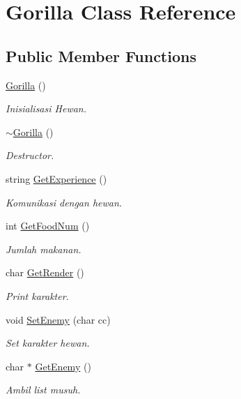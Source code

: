 \hypertarget{class_gorilla}{}\section{Gorilla Class Reference}
\label{class_gorilla}
\subsection*{Public Member Functions}
\begin{DoxyCompactItemize}
\item 
\hyperlink{class_gorilla_a01f4f53de267d241d46256ce1bb3cc3a}{Gorilla} ()\hypertarget{class_gorilla_a01f4f53de267d241d46256ce1bb3cc3a}{}\label{class_gorilla_a01f4f53de267d241d46256ce1bb3cc3a}

\begin{DoxyCompactList}\small\item\em Inisialisasi Hewan. \end{DoxyCompactList}\item 
\hyperlink{class_gorilla_a02383f1c2ef4a8ea19b8b17361e4117a}{$\sim$\+Gorilla} ()\hypertarget{class_gorilla_a02383f1c2ef4a8ea19b8b17361e4117a}{}\label{class_gorilla_a02383f1c2ef4a8ea19b8b17361e4117a}

\begin{DoxyCompactList}\small\item\em Destructor. \end{DoxyCompactList}\item 
string \hyperlink{class_gorilla_a3a5ec1d07dbfa5c49a4bd727d61cd16c}{Get\+Experience} ()\hypertarget{class_gorilla_a3a5ec1d07dbfa5c49a4bd727d61cd16c}{}\label{class_gorilla_a3a5ec1d07dbfa5c49a4bd727d61cd16c}

\begin{DoxyCompactList}\small\item\em Komunikasi dengan hewan. \end{DoxyCompactList}\item 
int \hyperlink{class_gorilla_a880231bab43e9fb9f00fded0a0cdd43c}{Get\+Food\+Num} ()
\begin{DoxyCompactList}\small\item\em Jumlah makanan. \end{DoxyCompactList}\item 
char \hyperlink{class_gorilla_a88cec900469a38e34b8e59ae4ee753a5}{Get\+Render} ()
\begin{DoxyCompactList}\small\item\em Print karakter. \end{DoxyCompactList}\item 
void \hyperlink{class_gorilla_a3ae2f60135e4eac50eb936ccca80a2fc}{Set\+Enemy} (char cc)
\begin{DoxyCompactList}\small\item\em Set karakter hewan. \end{DoxyCompactList}\item 
char $\ast$ \hyperlink{class_gorilla_ad3030e9367ff422f749afa86801edb03}{Get\+Enemy} ()
\begin{DoxyCompactList}\small\item\em Ambil list musuh. \end{DoxyCompactList}\end{DoxyCompactItemize}
